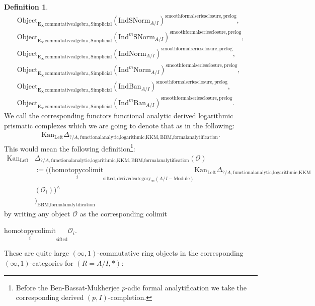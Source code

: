 \documentclass[11pt]{book}
\theoremstyle{definition}
\newtheorem{definition}[theorem]{Definition}
\numberwithin{equation}{section}
\begin{document}
\begin{definition}
\begin{align}
\mathrm{Object}_{\mathrm{E}_\infty\mathrm{commutativealgebra},\mathrm{Simplicial}}(\mathrm{IndSNorm}_{A/I})^{\mathrm{smoothformalseriesclosure},\text{prelog}},\\
\mathrm{Object}_{\mathrm{E}_\infty\mathrm{commutativealgebra},\mathrm{Simplicial}}(\mathrm{Ind}^m\mathrm{SNorm}_{A/I})^{\mathrm{smoothformalseriesclosure},\text{prelog}},\\
\mathrm{Object}_{\mathrm{E}_\infty\mathrm{commutativealgebra},\mathrm{Simplicial}}(\mathrm{IndNorm}_{A/I})^{\mathrm{smoothformalseriesclosure},\text{prelog}},\\
\mathrm{Object}_{\mathrm{E}_\infty\mathrm{commutativealgebra},\mathrm{Simplicial}}(\mathrm{Ind}^m\mathrm{Norm}_{A/I})^{\mathrm{smoothformalseriesclosure},\text{prelog}},\\
\mathrm{Object}_{\mathrm{E}_\infty\mathrm{commutativealgebra},\mathrm{Simplicial}}(\mathrm{IndBan}_{A/I})^{\mathrm{smoothformalseriesclosure},\text{prelog}},\\
\mathrm{Object}_{\mathrm{E}_\infty\mathrm{commutativealgebra},\mathrm{Simplicial}}(\mathrm{Ind}^m\mathrm{Ban}_{A/I})^{\mathrm{smoothformalseriesclosure},\text{prelog}}.
\end{align}
We call the corresponding functors functional analytic derived logarithmic prismatic complexes which we are going to denote that as in the following:
\begin{align}
\mathrm{Kan}_{\mathrm{Left}}\Delta_{?/A,\text{functionalanalytic,logarithmic,KKM},\text{BBM,formalanalytification}}.	
\end{align}
This would mean the following definition{\footnote{Before the Ben-Bassat-Mukherjee $p$-adic formal analytification we take the corresponding derived $(p,I)$-completion.}}:
\begin{align}
\mathrm{Kan}_{\mathrm{Left}}&\Delta_{?/A,\text{functionalanalytic,logarithmic,KKM},\text{BBM,formalanalytification}}(\mathcal{O})\\
&:=	((\underset{i}{\text{homotopycolimit}}_{\text{sifted},\text{derivedcategory}_{\infty}(A/I-\text{Module})}\mathrm{Kan}_{\mathrm{Left}}\Delta_{?/A,\text{functionalanalytic,logarithmic,KKM}}\\
&(\mathcal{O}_i))^\wedge\\
&)_\text{BBM,formalanalytification}
\end{align}
by writing any object $\mathcal{O}$ as the corresponding colimit 
\begin{center}
$\underset{i}{\text{homotopycolimit}}_\text{sifted}\mathcal{O}_i$.
\end{center}
These are quite large $(\infty,1)$-commutative ring objects in the corresponding $(\infty,1)$-categories for $(R=A/I,*)$:


\end{definition}
\end{document}
